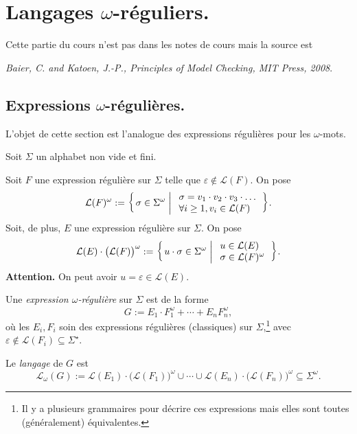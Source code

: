 \documentclass[./main]{subfiles}
\begin{document}

  \chapter{Langages $\omega$-réguliers.}

  Cette partie du cours n'est pas dans les notes de cours mais la source est 
  \begin{center}
    \textit{Baier, C. and Katoen, J.-P., Principles of Model Checking, MIT Press, 2008}.
  \end{center}

  \section{Expressions $\omega$-régulières.}

  L'objet de cette section est l'analogue des expressions régulières pour les $\omega$-mots.

  Soit $\Sigma$ un alphabet non vide et fini.

  \begin{defn}
    Soit $F$ une expression régulière sur $\Sigma$ telle que $\varepsilon \not\in \mathcal{L}(F)$. On pose
    \[
    \mathcal{L}(F)^\omega := \mleft\{\,\sigma \in \Sigma^\omega \;\middle|\; 
    \begin{array}{l}
      \sigma = v_1 \cdot v_2 \cdot v_3 \cdot \ldots\\
      \forall i \ge 1, v_i \in \mathcal{L}(F)
    \end{array}\,\mright\} 
    .\]
    Soit, de plus, $E$ une expression régulière sur $\Sigma$. On pose
    \[
    \mathcal{L}(E) \cdot \big(\mathcal{L}(F)\big)^\omega :=
    \mleft\{\,u \cdot \sigma \in \Sigma^\omega \;\middle|\;
    \begin{array}{l}
      u \in \mathcal{L}(E)\\
      \sigma \in \mathcal{L}(F)^\omega
    \end{array}\,\mright\} 
    .\]
    \textbf{Attention.} On peut avoir $u = \varepsilon \in \mathcal{L}(E)$.
  \end{defn}

  \begin{defn}
    Une \textit{expression $\omega$-régulière} sur $\Sigma$ est de la forme 
    \[
    G := E_1 \cdot F_1^\omega + \cdots + E_n F_n^\omega
    ,\] 
    où les $E_i, F_i$ soin des expressions régulières (classiques) sur $\Sigma$,\footnote{Il y a plusieurs grammaires pour décrire ces expressions mais elles sont toutes (généralement) équivalentes.}
    avec $\varepsilon \not\in \mathcal{L}(F_i) \subseteq \Sigma^\star$.

    Le \textit{langage} de $G$ est 
    \[
    \mathcal{L}_\omega(G) :=
    \mathcal{L}(E_1) \cdot \big(\mathcal{L}(F_1)\big)^\omega
    \cup \cdots \cup 
    \mathcal{L}(E_n) \cdot \big(\mathcal{L}(F_n)\big)^\omega
    \subseteq \Sigma^\omega
    .\]
  \end{defn}
\end{document}
